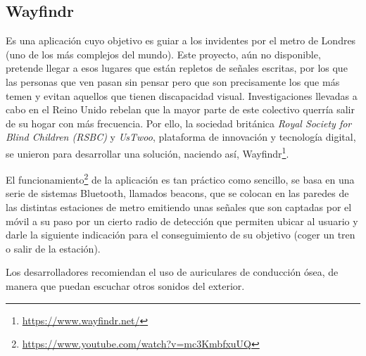 \documentclass{article}
\begin{document}
    \subsection{Wayfindr} %
        Es una aplicación cuyo objetivo es guiar a los invidentes por el metro de Londres (uno de los más complejos del mundo). Este proyecto, aún no disponible, pretende llegar a esos lugares que están repletos de señales escritas, por los que las personas que ven pasan sin pensar pero que son precisamente los que más temen y evitan aquellos que tienen discapacidad visual. Investigaciones llevadas a cabo en el Reino Unido rebelan que la mayor parte de este colectivo querría salir de su hogar con más frecuencia. Por ello, la sociedad británica \textit{Royal Society for Blind Children (RSBC)} y \textit{UsTwoo}, plataforma de innovación y tecnología digital, se unieron para desarrollar una solución, naciendo así, Wayfindr\footnote{\url{https://www.wayfindr.net/}}.
        
        El funcionamiento\footnote{\url{https://www.youtube.com/watch?v=mc3KmbfxuUQ}} de la aplicación es tan práctico como sencillo, se basa en una serie de sistemas Bluetooth, llamados beacons, que se colocan en las paredes de las distintas estaciones de metro emitiendo unas señales que son captadas por el móvil a su paso por un cierto radio de detección que permiten ubicar al usuario y darle la siguiente indicación para el conseguimiento de su objetivo (coger un tren o salir de la estación).
        
        Los desarrolladores recomiendan el uso de auriculares de conducción ósea, de manera que puedan escuchar otros sonidos del exterior.
 
	
\end{document}
